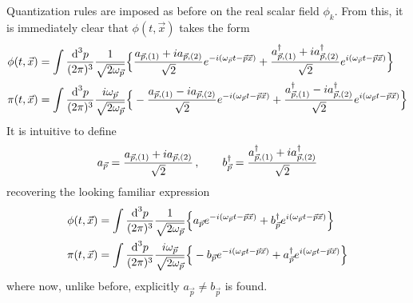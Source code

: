 Quantization rules are imposed as before on the real scalar field $\phi_k$. From this, it is immediately clear that $\phi(t,\vec{x})$ takes the form
\begin{subequations}    
    \begin{align}
        \phi(t,\vec{x})&=\int\frac{\text{d}^3p}{(2\pi)^3}\frac{1}{\sqrt{2\omega_{\vec{p}}}}\Big\{\frac{a_{\vec{p},(1)}+{i} a_{\vec{p},(2)}}{\sqrt{2}}e^{-{i}(\omega_{\vec{p}}t-\vec{p}\vec{x})}+\frac{a_{\vec{p},(1)}^\dagger+{i} a_{\vec{p},(2)}^\dagger}{\sqrt{2}}e^{{i}(\omega_{\vec{p}}t-\vec{p}\vec{x})}\Big\}\\
        \pi(t,\vec{x})&=\int\frac{\text{d}^3p}{(2\pi)^3}\frac{{i}\omega_{\vec{p}}}{\sqrt{2\omega_{\vec{p}}}}\Big\{-\frac{a_{\vec{p},(1)}-{i} a_{\vec{p},(2)}}{\sqrt{2}}e^{-{i}(\omega_{\vec{p}}t-\vec{p}\vec{x})}+\frac{a_{\vec{p},(1)}^\dagger-{i} a_{\vec{p},(2)}^\dagger}{\sqrt{2}}e^{{i}(\omega_{\vec{p}}t-\vec{p}\vec{x})}\Big\}
    \end{align}
\end{subequations}
    It is intuitive to define
    \begin{equation}
    a_{\vec{p}}=\frac{a_{\vec{p},(1)}+{i} a_{\vec{p},(2)}}{\sqrt{2}}\,,\qquad b_{\vec{p}}^\dagger=\frac{a_{\vec{p},(1)}^\dagger+{i} a_{\vec{p},(2)}^\dagger}{\sqrt{2}}
\end{equation}
recovering the looking familiar expression
\begin{subequations}    
    \begin{align}
        \phi(t,\vec{x})&=\int\frac{\text{d}^3p}{(2\pi)^3}\frac{1}{\sqrt{2\omega_{\vec{p}}}}\Big\{a_{\vec{p}}e^{-{i}(\omega_{\vec{p}}t-\vec{p}\vec{x})}+b_{\vec{p}}^\dagger e^{{i}(\omega_{\vec{p}}t-\vec{p}\vec{x})}\Big\}\\
        \pi(t,\vec{x})&=\int\frac{\text{d}^3p}{(2\pi)^3}\frac{{i}\omega_{\vec{p}}}{\sqrt{2\omega_{\vec{p}}}}\Big\{-b_{\vec{p}}e^{-{i}(\omega_{\vec{p}}t-\vec{p}\vec{x})}+a_{\vec{p}}^\dagger e^{{i}(\omega_{\vec{p}}t-\vec{p}\vec{x})}\Big\}
    \end{align}
\end{subequations}
where now, unlike before, explicitly $a_{\vec{p}}\neq b_{\vec{p}}$ is found.

